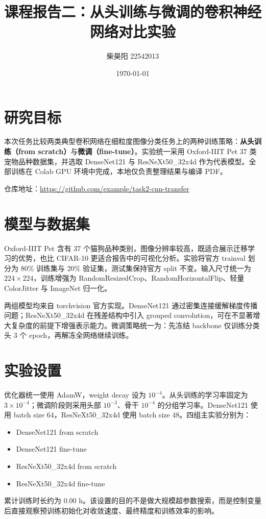 \documentclass[UTF8,a4paper,twocolumn]{ctexart}
\title{课程报告二：从头训练与微调的卷积神经网络对比实验}
\author{柴昊阳 22542013}
\date{\today}
\begin{document}
\maketitle
\small

\section{研究目标}
本次任务比较两类典型卷积网络在细粒度图像分类任务上的两种训练策略：\textbf{从头训练（from scratch）}与\textbf{微调（fine-tune）}。实验统一采用 Oxford-IIIT Pet 37 类宠物品种数据集，并选取 DenseNet121 与 ResNeXt50\_32x4d 作为代表模型。全部训练在 Colab GPU 环境中完成，本地仅负责整理结果与编译 PDF。

仓库地址：\url{https://github.com/example/task2-cnn-transfer}

\section{模型与数据集}
Oxford-IIIT Pet 含有 37 个猫狗品种类别，图像分辨率较高，既适合展示迁移学习的优势，也比 CIFAR-10 更适合报告中的可视化分析。实验将官方 trainval 划分为 80\% 训练集与 20\% 验证集，测试集保持官方 split 不变。输入尺寸统一为 $224\times224$，训练增强为 RandomResizedCrop、RandomHorizontalFlip、轻量 ColorJitter 与 ImageNet 归一化。

两组模型均来自 torchvision 官方实现。DenseNet121 通过密集连接缓解梯度传播问题；ResNeXt50\_32x4d 在残差结构中引入 grouped convolution，可在不显著增大复杂度的前提下增强表示能力。微调策略统一为：先冻结 backbone 仅训练分类头 3 个 epoch，再解冻全网络继续训练。

\section{实验设置}
优化器统一使用 AdamW，weight decay 设为 $10^{-4}$。从头训练的学习率固定为 $3\times10^{-4}$；微调阶段则采用头部 $10^{-3}$、骨干 $10^{-4}$ 的分组学习率。DenseNet121 使用 batch size 64，ResNeXt50\_32x4d 使用 batch size 48。四组主实验分别为：
\begin{itemize}
\item DenseNet121 from scratch
\item DenseNet121 fine-tune
\item ResNeXt50\_32x4d from scratch
\item ResNeXt50\_32x4d fine-tune
\end{itemize}

累计训练时长约为 0.00 h。该设置的目的不是做大规模超参数搜索，而是控制变量后直接观察预训练初始化对收敛速度、最终精度和训练效率的影响。
\end{document}
